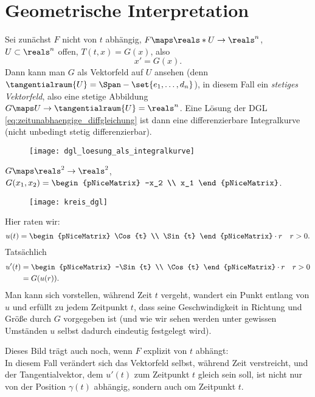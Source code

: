 \section{Geometrische Interpretation}
Sei zunächst \( F \) nicht von \( t \) abhängig, \( F\maps \reals*U\to \reals^n \), \( U\subset \reals^n \) offen, \( T(t,x)=G(x) \), also
\begin{equation*}
  x'=G(x)\tag{\(**\)}\label{eq:zeitunabhaengige_diffgleichung}.
\end{equation*}
Dann kann man \( G \) als Vektorfeld auf \( U \) ansehen (denn \( \tangentialraum{U}=\Span-{\set{e_1,\dotsc,d_n}} \)), in diesem Fall ein \emph{stetiges Vektorfeld}, also eine stetige Abbildung \( G\maps  U \to \tangentialraum{U}=\reals^n \). Eine Lösung der DGL \eqref{eq:zeitunabhaengige_diffgleichung} ist dann eine differenzierbare Integralkurve (nicht unbedingt stetig differenzierbar).
\begin{figure}[H]
  \centering
  \texttt{[image: dgl\_loesung\_als\_integralkurve]}
  \label{fig:dgl_loesung_als_integralkurve}
\end{figure}
\begin{beispiel*}
  \( G\maps \reals^2\to \reals^2 \), \( G(x_1,x_2)=\begin{pNiceMatrix} -x_2 \\ x_1 \end{pNiceMatrix} \).
  \begin{figure}[H]
    \centering
    \texttt{[image: kreis\_dgl]}
    \label{fig:kreis_dgl}
  \end{figure}
  Hier raten wir:
  \begin{equation*}
    u(t)=\begin{pNiceMatrix} \Cos{t} \\ \Sin{t} \end{pNiceMatrix}\cdot r\quad r>0.
  \end{equation*}
  Tatsächlich
  \begin{align*}
    u'(t)&=\begin{pNiceMatrix} -\Sin{t} \\ \Cos{t} \end{pNiceMatrix}\cdot r\quad r>0\\
    &=G(u(r)).
  \end{align*}
  Man kann sich vorstellen, während Zeit \( t \) vergeht, wandert ein Punkt entlang von \( u \) und erfüllt zu jedem Zeitpunkt \( t \), dass seine Geschwindigkeit in Richtung und Größe durch \( G \) vorgegeben ist (und wie wir sehen werden unter gewissen Umständen \( u \) selbst dadurch eindeutig festgelegt wird). 
  
  Dieses Bild trägt auch noch, wenn \( F \) explizit von \( t \) abhängt:\\
  In diesem Fall verändert sich das Vektorfeld selbst, während Zeit verstreicht, und der Tangentialvektor, dem \( u'(t) \) zum Zeitpunkt \( t \) gleich sein soll, ist nicht nur von der Position \( \gamma(t) \) abhängig, sondern auch om Zeitpunkt \( t \).
\end{beispiel*}
